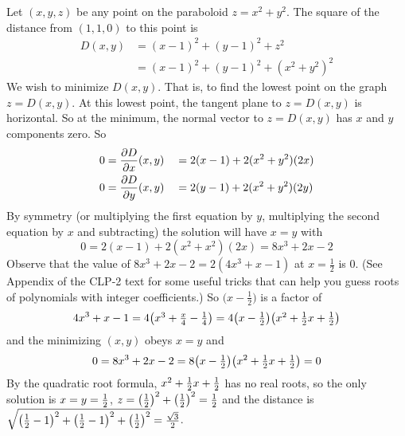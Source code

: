 \begin{solution}
Let $(x,y,z)$ be any point on the paraboloid $z=x^2+y^2$. The square of the
distance from $(1,1,0)$ to this point is 
\begin{align*}
D(x,y)&=(x-1)^2+(y-1)^2+z^2\\
&=(x-1)^2+(y-1)^2+{(x^2+y^2)}^2
\end{align*}
We wish to minimize $D(x,y)$. That is, to find the lowest point on the
graph $z=D(x,y)$. At this lowest point, the tangent plane to $z=D(x,y)$
is horizontal. So at the minimum, the normal vector to $z=D(x,y)$
has $x$ and $y$ components zero. So
\begin{alignat*}{5}
0&=\pdiff{D}{x}(x,y)&&= 2(x-1)+2(x^2+y^2)(2x)\\
0&=\pdiff{D}{y}(x,y)&&= 2(y-1)+2(x^2+y^2)(2y)
\end{alignat*}
By symmetry (or multiplying the first equation by $y$, multiplying the
second equation by $x$ and subtracting) the solution will have $x=y$
with
\begin{equation*}
0=2(x-1)+2(x^2+x^2)(2x)=8x^3+2x-2
\end{equation*}
Observe that the value of $8x^3+2x-2=2(4x^3+x-1)$ at $x=\frac{1}{2}$ is $0$.
(See Appendix  of the CLP-2 text for some 
useful tricks that can help you guess roots of polynomials with 
integer coefficients.) So $\big(x-\frac{1}{2}\big)$ is a factor of
\begin{equation*}
4x^3+x-1
={\textstyle 4\big(x^3+\frac{x}{4}-\frac{1}{4}\big)
            =4\big(x-\frac{1}{2}\big)\big(x^2+\tfrac{1}{2} x+\tfrac{1}{2}\big)}
\end{equation*}
and the minimizing $(x,y)$ obeys $x=y$ and
\begin{equation*}
0=8x^3+2x-2
=8\big(x-\tfrac{1}{2}\big)\big(x^2+\tfrac{1}{2} x+\tfrac{1}{2}\big)=0
\end{equation*}
By the quadratic root formula, $x^2+\tfrac{1}{2} x+\tfrac{1}{2}$ has no real roots, so
the only solution is $x=y=\tfrac{1}{2}$, $z=\big(\tfrac{1}{2}\big)^2+\big(\tfrac{1}{2}\big)^2=\tfrac{1}{2}$
and the distance is $\sqrt{\big(\tfrac{1}{2}-1\big)^2+\big(\tfrac{1}{2}-1\big)^2
+\big(\tfrac{1}{2}\big)^2}=\frac{\sqrt{3}}{2}$.
\end{solution}
